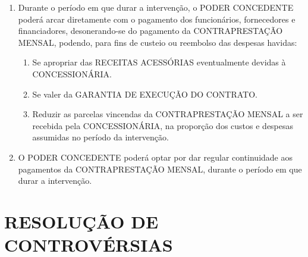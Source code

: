 \documentclass[a4paper,11pt]{report} %
\begin{document}
\begin{enumerate}
\item \label{itm:G9VM} Durante o período em que durar a intervenção, o PODER CONCEDENTE poderá arcar diretamente com o pagamento dos funcionários, fornecedores e financiadores, desonerando-se do pagamento da CONTRAPRESTAÇÃO MENSAL, podendo, para fins de custeio ou reembolso das despesas havidas:

\begin{enumerate}[label*=\arabic*.]
\item \label{itm:VB4D} Se apropriar das RECEITAS ACESSÓRIAS eventualmente devidas à CONCESSIONÁRIA.

\item \label{itm:G2P3} Se valer da GARANTIA DE EXECUÇÃO DO CONTRATO.

\item \label{itm:KTAP} Reduzir as parcelas vincendas da CONTRAPRESTAÇÃO MENSAL a ser recebida pela CONCESSIONÁRIA, na proporção dos custos e despesas assumidas no período da intervenção.
\end{enumerate}

\item \label{itm:CMQE} O PODER CONCEDENTE poderá optar por dar regular continuidade aos pagamentos da CONTRAPRESTAÇÃO MENSAL, durante o período em que durar a intervenção.

\end{enumerate}

\section{RESOLUÇÃO DE CONTROVÉRSIAS}
\label{sec:E4H4}
\end{document}
